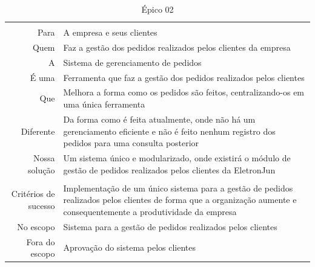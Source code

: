 \begin{table}[]
\centering
\label{label-epico02}
\begin{tabular}{
>{\columncolor[HTML]{96FFFB}}r l}
\multicolumn{2}{c}{\cellcolor[HTML]{34CDF9}Gerenciamento de pedidos}            \\
Para                 & A empresa e seus clientes                       \\
Quem                 & Faz a gestão dos pedidos realizados pelos clientes da empresa            \\
A                    & Sistema de gerenciamento de pedidos             \\
É uma                & Ferramenta que faz a gestão dos pedidos realizados pelos clientes                      \\
Que                  & Melhora a forma como os pedidos são feitos, centralizando-os em uma única ferramenta                     \\
Diferente            & Da forma como é feita atualmente, onde não há um gerenciamento eficiente e não é feito nenhum registro dos pedidos para uma consulta posterior                       \\
Nossa solução        & Um sistema único e modularizado, onde existirá o módulo de gestão de pedidos realizados pelos clientes da EletronJun          \\
\multicolumn{2}{c}{\cellcolor[HTML]{34CDF9}Escopo}                     \\
Critérios de sucesso & Implementação de um único sistema para a gestão de pedidos realizados pelos clientes de forma que a organização aumente e consequentemente a produtividade da empresa \\
No escopo            & Sistema para a gestão de pedidos realizados pelos clientes   \\
Fora do escopo       & Aprovação do sistema pelos clientes            
\end{tabular}
\caption{Épico 02}
\end{table}


